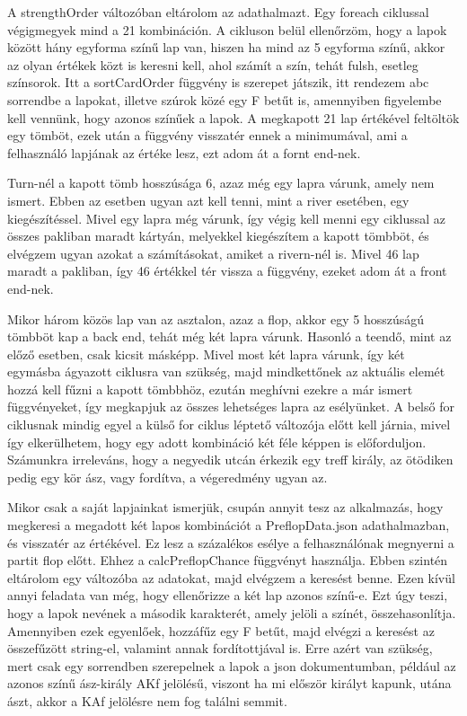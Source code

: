A strengthOrder változóban eltárolom az adathalmazt. Egy foreach ciklussal végigmegyek mind a 21 kombináción. A cikluson belül ellenőrzöm, hogy a lapok között hány egyforma színű lap van, hiszen ha mind az 5 egyforma színű, akkor az olyan értékek közt is keresni kell, ahol számít a szín, tehát fulsh, esetleg színsorok. Itt a sortCardOrder függvény is szerepet játszik, itt rendezem abc sorrendbe a lapokat, illetve szúrok közé egy F betűt is, amennyiben figyelembe kell vennünk, hogy azonos színűek a lapok. A megkapott 21 lap értékével feltöltök egy tömböt, ezek után a függvény visszatér ennek a minimumával, ami a felhasználó lapjának az értéke lesz, ezt adom át a fornt end-nek.

Turn-nél a kapott tömb hosszúsága 6, azaz még egy lapra várunk, amely nem ismert. Ebben az esetben ugyan azt kell tenni, mint a river esetében, egy kiegészítéssel. Mivel egy lapra még várunk, így végig kell menni egy ciklussal az összes pakliban maradt kártyán, melyekkel kiegészítem a kapott tömbböt, és elvégzem ugyan azokat a számításokat, amiket a rivern-nél is. Mivel 46 lap maradt a pakliban, így 46 értékkel tér vissza a függvény, ezeket adom át a front end-nek.

Mikor három közös lap van az asztalon, azaz a flop, akkor egy 5 hosszúságú tömbböt kap a back end, tehát még két lapra várunk.  Hasonló a teendő, mint az előző esetben, csak kicsit másképp. Mivel most két lapra várunk, így két egymásba ágyazott ciklusra van szükség, majd mindkettőnek az aktuális elemét hozzá kell fűzni a kapott tömbbhöz, ezután meghívni ezekre a már ismert függvényeket, így megkapjuk az összes lehetséges lapra az esélyünket. A belső for ciklusnak mindig egyel a külső for ciklus léptető változója előtt kell járnia, mivel így elkerülhetem, hogy egy adott kombináció két féle képpen is előforduljon. Számunkra irreleváns, hogy a negyedik utcán érkezik egy treff király, az ötödiken pedig egy kör ász, vagy fordítva, a végeredmény ugyan az.

Mikor csak a saját lapjainkat ismerjük, csupán annyit tesz az alkalmazás, hogy megkeresi a megadott két lapos kombinációt a PreflopData.json adathalmazban, és visszatér az értékével. Ez lesz a százalékos esélye a felhasználónak megnyerni a partit flop előtt. Ehhez a calcPreflopChance függvényt használja. Ebben szintén eltárolom egy változóba az adatokat, majd elvégzem a keresést benne. Ezen kívül annyi feladata van még, hogy ellenőrizze a két lap azonos színű-e. Ezt úgy teszi, hogy a lapok nevének a második karakterét, amely jelöli a színét, összehasonlítja. Amennyiben ezek egyenlőek, hozzáfűz egy F betűt, majd elvégzi a keresést az összefűzött string-el, valamint annak fordítottjával is. Erre azért van szükség, mert csak egy sorrendben szerepelnek a lapok a json dokumentumban, például az azonos színű ász-király AKf jelölésű, viszont ha mi először királyt kapunk, utána ászt, akkor a KAf jelölésre nem fog találni semmit.

